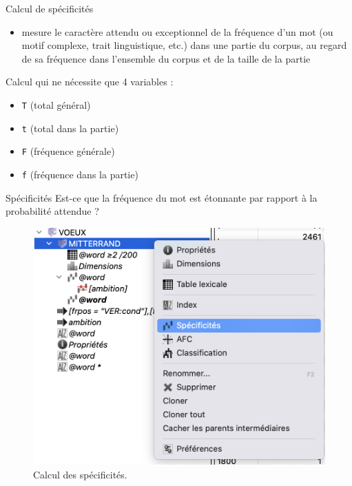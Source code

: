 \documentclass[xetex,xcolor={table,usenames,dvipsnames}]{beamer}
\begin{document}
\begin{frame}{Calcul de spécificités \citep{lafon1980variabilite}}
	\begin{block}{\vspace{-6mm}}
		\justifying
		\begin{itemize}
			\item mesure le caractère attendu ou exceptionnel de la fréquence
			d’un mot (ou motif complexe, trait linguistique, etc.) dans une partie du corpus, au regard de sa
			fréquence dans l’ensemble du corpus et de la taille de la partie
		\end{itemize}
	\end{block}
	
	Calcul qui ne nécessite que 4 variables :
	\begin{itemize}
		\item \texttt{T} (total général)
		\item \texttt{t} (total dans la partie)
		\item \texttt{F} (fréquence générale)
		\item \texttt{f} (fréquence dans la partie)
	\end{itemize}
\end{frame}

\begin{frame}{Spécificités}
	Est-ce que la fréquence du mot est étonnante
	par rapport à la probabilité attendue ?
	\begin{figure}[h] %
	\centering
	\includegraphics[width=.6\linewidth]{img/specificites.png}
	\caption{Calcul des spécificités.}
	\label{fig:ling_out_TAL}
\end{figure}
\end{frame}
\end{document}

